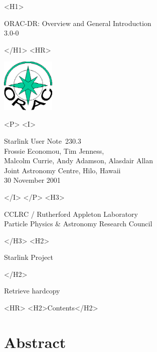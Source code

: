 \documentclass[twoside,11pt]{article}
\newcommand{\stardoccategory}  {Starlink User Note}
\newcommand{\stardocsource}    {sun\stardocnumber}
\newcommand{\stardocnumber}    {230.3}
\newcommand{\stardocauthors}   {Frossie Economou, Tim Jenness,\\ 
Malcolm Currie, Andy Adamson, Alasdair Allan\\
Joint Astronomy Centre, Hilo, Hawaii}
\newcommand{\stardocdate}      {30 November 2001}
\newcommand{\stardoctitle}     {ORAC-DR: Overview and General Introduction}
\newcommand{\stardocversion}   {3.0-0}
\newcommand{\stardocmanual}    {}
\newcommand{\htmladdnormallink}[2]{#1}
\newcommand{\htmladdimg}[1]{}
\newcommand{\htmlref}[2]{#1}
\newcommand{\htmladdtonavigation}[1]{}
\newcommand{\xlabel}[1]{}
\renewcommand{\_}{\texttt{\symbol{95}}}
\begin{document}
\begin{htmlonly}
   \xlabel{}
   \begin{rawhtml} <H1> \end{rawhtml}
      \stardoctitle\\
      \stardocversion\\
      \stardocmanual
   \begin{rawhtml} </H1> <HR> \end{rawhtml}

\includegraphics[width=1.0in]{sun230_logo.eps}

   \begin{rawhtml} <P> <I> \end{rawhtml}
   \stardoccategory\ \stardocnumber \\
   \stardocauthors \\
   \stardocdate
   \begin{rawhtml} </I> </P> <H3> \end{rawhtml}
      \htmladdnormallink{CCLRC / Rutherford Appleton Laboratory}
                        {http://www.cclrc.ac.uk} \\
      \htmladdnormallink{Particle Physics \& Astronomy Research Council}
                        {http://www.pparc.ac.uk} \\
   \begin{rawhtml} </H3> <H2> \end{rawhtml}
      \htmladdnormallink{Starlink Project}{http://www.starlink.rl.ac.uk/}
   \begin{rawhtml} </H2> \end{rawhtml}
   \htmladdnormallink{\htmladdimg{source.gif} Retrieve hardcopy}
      {http://www.starlink.rl.ac.uk/cgi-bin/hcserver?\stardocsource}\\

  \label{stardoccontents}
  \begin{rawhtml} 
    <HR>
    <H2>Contents</H2>
  \end{rawhtml}
  \htmladdtonavigation{\htmlref{\htmladdimg{contents_motif.gif}}
        {stardoccontents}}

  \section{\xlabel{abstract}Abstract}
\end{htmlonly}
\end{document}
